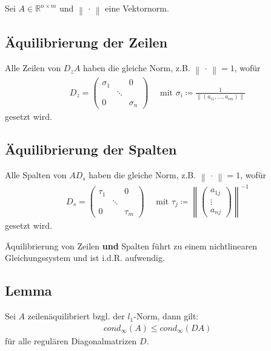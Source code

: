 \documentclass[ngerman,fontsize=11pt, paper=a4, parskip=half, titlepage=true, toc=bib]{scrbook}
\newcommand{\Renm}{\mathds{R}^{n\times m}}
\newcommand{\nn}[1]{\left\| #1 \right\|}
\begin{document}
    Sei $A\in\Renm $ und $\nn{\,\cdot\,} $ eine Vektornorm.
  
  
  \subsection{Äquilibrierung der Zeilen} 
  Alle Zeilen von $D_zA$ haben die gleiche Norm, z.B. $\nn{\,\cdot\,} =1$, wofür 
  \begin{gather}
  	D_z = \begin{pmatrix}
  	\sigma_1 & & 0 \\
  	&\ddots & \\ 
  	0 && \sigma_n
  	\end{pmatrix}
  	 \quad \text{ mit }\sigma_i\coloneqq \frac{1}{\nn{(a_{i1}, \dots , a_{im})}}
  	 \label{IV.1.1}
  \end{gather}
  gesetzt wird.


  \subsection{Äquilibrierung der Spalten} 
  Alle Spalten von $AD_s$ haben die gleiche Norm, z.B. $\nn{\,\cdot\,} =1$, wofür 
  \begin{gather}
  D_s = \begin{pmatrix}
  \tau_1 & & 0 \\
  &\ddots & \\ 
  0 && \tau_m
  \end{pmatrix}
  \quad \text{ mit }\tau_j\coloneqq \nn{\begin{pmatrix}
  		a_{1j} \\ \vdots \\ a_{nj}
  		\end{pmatrix}}^{-1}
  \label{IV.1.2}
  \end{gather}
  gesetzt wird.
  
  Äquilibrierung von Zeilen \textbf{und} Spalten führt zu einem nichtlinearen Gleichungssystem und ist i.d.R. aufwendig.
  
  
  \subsection{Lemma} \label{4.3.1}
  Sei $A$ zeilenäquilibriert bzgl. der $l_1$-Norm, dann gilt:
  \begin{gather}
  	cond_{\infty}(A) \leq cond_{\infty}(DA)  \label{IV.1.3}
  \end{gather}
  für alle regulären Diagonalmatrizen $D$.
  
\end{document}
